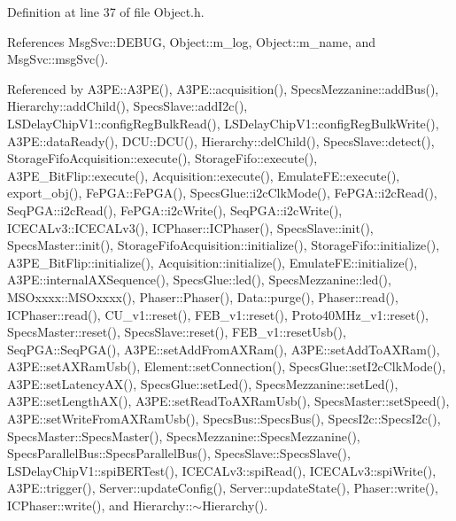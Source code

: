 Definition at line 37 of file Object.\+h.



References Msg\+Svc\+::\+D\+E\+B\+UG, Object\+::m\+\_\+log, Object\+::m\+\_\+name, and Msg\+Svc\+::msg\+Svc().



Referenced by A3\+P\+E\+::\+A3\+P\+E(), A3\+P\+E\+::acquisition(), Specs\+Mezzanine\+::add\+Bus(), Hierarchy\+::add\+Child(), Specs\+Slave\+::add\+I2c(), L\+S\+Delay\+Chip\+V1\+::config\+Reg\+Bulk\+Read(), L\+S\+Delay\+Chip\+V1\+::config\+Reg\+Bulk\+Write(), A3\+P\+E\+::data\+Ready(), D\+C\+U\+::\+D\+C\+U(), Hierarchy\+::del\+Child(), Specs\+Slave\+::detect(), Storage\+Fifo\+Acquisition\+::execute(), Storage\+Fifo\+::execute(), A3\+P\+E\+\_\+\+Bit\+Flip\+::execute(), Acquisition\+::execute(), Emulate\+F\+E\+::execute(), export\+\_\+obj(), Fe\+P\+G\+A\+::\+Fe\+P\+G\+A(), Specs\+Glue\+::i2c\+Clk\+Mode(), Fe\+P\+G\+A\+::i2c\+Read(), Seq\+P\+G\+A\+::i2c\+Read(), Fe\+P\+G\+A\+::i2c\+Write(), Seq\+P\+G\+A\+::i2c\+Write(), I\+C\+E\+C\+A\+Lv3\+::\+I\+C\+E\+C\+A\+Lv3(), I\+C\+Phaser\+::\+I\+C\+Phaser(), Specs\+Slave\+::init(), Specs\+Master\+::init(), Storage\+Fifo\+Acquisition\+::initialize(), Storage\+Fifo\+::initialize(), A3\+P\+E\+\_\+\+Bit\+Flip\+::initialize(), Acquisition\+::initialize(), Emulate\+F\+E\+::initialize(), A3\+P\+E\+::internal\+A\+X\+Sequence(), Specs\+Glue\+::led(), Specs\+Mezzanine\+::led(), M\+S\+Oxxxx\+::\+M\+S\+Oxxxx(), Phaser\+::\+Phaser(), Data\+::purge(), Phaser\+::read(), I\+C\+Phaser\+::read(), C\+U\+\_\+v1\+::reset(), F\+E\+B\+\_\+v1\+::reset(), Proto40\+M\+Hz\+\_\+v1\+::reset(), Specs\+Master\+::reset(), Specs\+Slave\+::reset(), F\+E\+B\+\_\+v1\+::reset\+Usb(), Seq\+P\+G\+A\+::\+Seq\+P\+G\+A(), A3\+P\+E\+::set\+Add\+From\+A\+X\+Ram(), A3\+P\+E\+::set\+Add\+To\+A\+X\+Ram(), A3\+P\+E\+::set\+A\+X\+Ram\+Usb(), Element\+::set\+Connection(), Specs\+Glue\+::set\+I2c\+Clk\+Mode(), A3\+P\+E\+::set\+Latency\+A\+X(), Specs\+Glue\+::set\+Led(), Specs\+Mezzanine\+::set\+Led(), A3\+P\+E\+::set\+Length\+A\+X(), A3\+P\+E\+::set\+Read\+To\+A\+X\+Ram\+Usb(), Specs\+Master\+::set\+Speed(), A3\+P\+E\+::set\+Write\+From\+A\+X\+Ram\+Usb(), Specs\+Bus\+::\+Specs\+Bus(), Specs\+I2c\+::\+Specs\+I2c(), Specs\+Master\+::\+Specs\+Master(), Specs\+Mezzanine\+::\+Specs\+Mezzanine(), Specs\+Parallel\+Bus\+::\+Specs\+Parallel\+Bus(), Specs\+Slave\+::\+Specs\+Slave(), L\+S\+Delay\+Chip\+V1\+::spi\+B\+E\+R\+Test(), I\+C\+E\+C\+A\+Lv3\+::spi\+Read(), I\+C\+E\+C\+A\+Lv3\+::spi\+Write(), A3\+P\+E\+::trigger(), Server\+::update\+Config(), Server\+::update\+State(), Phaser\+::write(), I\+C\+Phaser\+::write(), and Hierarchy\+::$\sim$\+Hierarchy().


